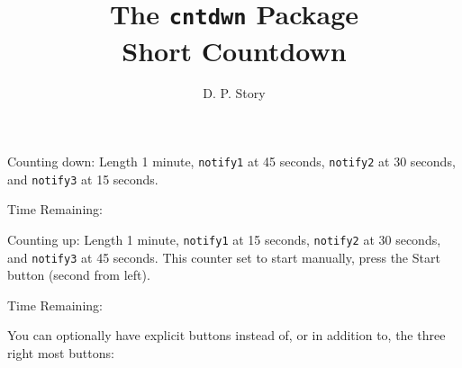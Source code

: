 \documentclass{article}
\title{The \texttt{cntdwn} Package
    \texorpdfstring{\\[6pt]}{: }Short Countdown}
\author{D. P. Story}
\begin{document}
\maketitle


Counting down: Length 1 minute, \texttt{notify1} at 45 seconds, \texttt{notify2} at 30
seconds, and \texttt{notify3} at 15 seconds.

Time Remaining:

\begin{center}
\end{center}

\newpage

Counting up: Length 1 minute, \texttt{notify1} at 15 seconds, \texttt{notify2} at 30
seconds, and \texttt{notify3} at 45 seconds. This counter set to start
manually, press the Start button (second from left).

Time Remaining:

You can optionally have explicit buttons instead of, or in addition to, the
three right most buttons:

\begin{center}
\end{center}
\end{document}
